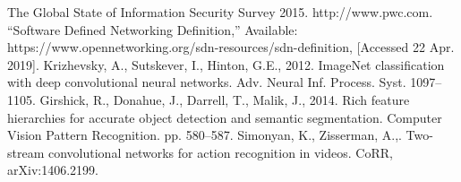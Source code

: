 \documentclass[letterpaper, 10 pt, conference]{ieeeconf}
\begin{document}
\begin{thebibliography}{99}
 The Global State of Information Security Survey 2015. http://www.pwc.com.
 “Software Defined Networking Definition,” Available:
https://www.opennetworking.org/sdn-resources/sdn-definition, [Accessed 22 Apr. 2019].
 Krizhevsky, A., Sutskever, I., Hinton, G.E., 2012. ImageNet classification with deep
convolutional neural networks. Adv. Neural Inf. Process. Syst. 1097–1105.
 Girshick, R., Donahue, J., Darrell, T., Malik, J., 2014. Rich feature hierarchies for accurate
object detection and semantic segmentation. Computer Vision Pattern Recognition.
pp. 580–587.
 Simonyan, K., Zisserman, A.,. Two-stream convolutional networks for action recognition
in videos. CoRR, arXiv:1406.2199.

\end{thebibliography}
\end{document}
